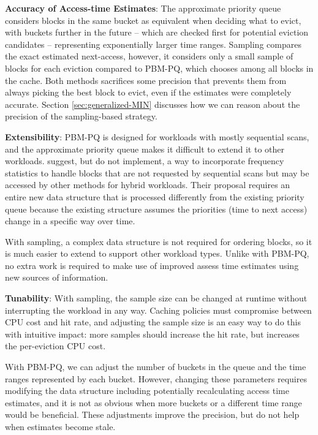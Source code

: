 \textbf{Accuracy of Access-time Estimates}: The approximate priority queue considers blocks in the same bucket as equivalent when deciding what to evict, with buckets further in the future -- which are checked first for potential eviction candidates -- representing exponentially larger time ranges. Sampling compares the exact estimated next-access, however, it considers only a small sample of blocks for each eviction compared to PBM-PQ, which chooses among all blocks in the cache. Both methods sacrifices some precision that prevents them from always picking the best block to evict, even if the estimates were completely accurate. Section \ref{sec:generalized-MIN} discusses how we can reason about the precision of the sampling-based strategy.  %

\textbf{Extensibility}: PBM-PQ is designed for workloads with mostly sequential scans, and the approximate priority queue makes it difficult to extend it to other workloads. \citet{pbm} suggest, but do not implement, a way to incorporate frequency statistics to handle blocks that are not requested by sequential scans but may be accessed by other methods for hybrid workloads. Their proposal requires an entire new data structure that is processed differently from the existing priority queue because the existing structure assumes the priorities (time to next access) change in a specific way over time. 

With sampling, a complex data structure is not required for ordering blocks, so it is much easier to extend to support other workload types. Unlike with PBM-PQ, no extra work is required to make use of improved assess time estimates using new sources of information.

\textbf{Tunability}: With sampling, the sample size can be changed at runtime without interrupting the workload in any way. Caching policies must compromise between CPU cost and hit rate, and adjusting the sample size is an easy way to do this with intuitive impact: more samples should increase the hit rate, but increases the per-eviction CPU cost.

With PBM-PQ, we can adjust the number of buckets in the queue and the time ranges represented by each bucket. However, changing these parameters requires modifying the data structure including potentially recalculating access time estimates, and it is not as obvious when more buckets or a different time range would be beneficial. These adjustments improve the precision, but do not help when estimates become stale.


